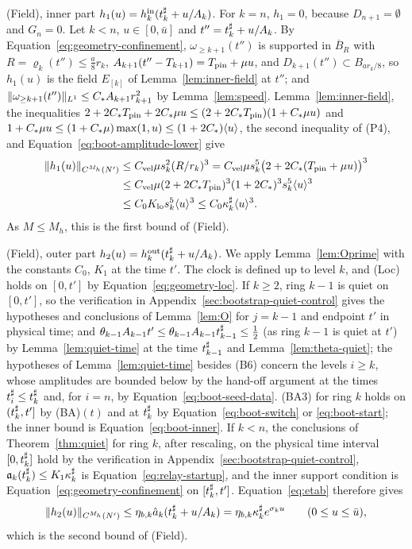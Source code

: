 (Field), inner part $h_1(u)=h^{\mathrm{in}}_k(t^\sharp_k+u/A_k)$. For $k=n$, $h_1=0$, because
$D_{n+1}=\emptyset$ and $G_n=0$. Let $k<n$, $u\in[0,\bar u]$ and
$t''=t^\sharp_k+u/A_k$. By Equation~\eqref{eq:geometry-confinement}, $\omega_{\ge k+1}(t'')$ is
supported in $\overline B_R$ with $R=\varrho_k(t'')\le\frac a8r_k$,
$A_{k+1}(t''-T_{k+1})=T_{\mathrm{pin}}+\mu u$, and $D_{k+1}(t'')\subset B_{ar_k/8}$, so
$h_1(u)$ is the field $E_{[k]}$ of Lemma~\ref{lem:inner-field} at $t''$; and
$\|\omega_{\ge k+1}(t'')\|_{L^1}\le C_{*} A_{k+1}r_{k+1}^2$ by
Lemma~\ref{lem:speed}. Lemma~\ref{lem:inner-field}, the inequalities
$2+2C_{*}T_{\mathrm{pin}}+2C_{*}\mu u\le(2+2C_{*}T_{\mathrm{pin}})(1+C_{*}\mu u)$ and
$1+C_{*}\mu u\le(1+C_{*}\mu)\max(1,u)\le(1+2C_{*})\langle u\rangle$, the second inequality of (P4), and Equation~\eqref{eq:boot-amplitude-lower} give
\begin{equation}
\label{eq:boot-inner}
\begin{aligned}
\|h_1(u)\|_{C^{M_h}(N')}&\le C_{\mathrm{vel}} \mu s_k^2(R/r_k)^3=C_{\mathrm{vel}} \mu s_k^5\big(2+2C_{*}(T_{\mathrm{pin}}+\mu u)\big)^3\\
&\le C_{\mathrm{vel}} \mu(2+2C_{*}T_{\mathrm{pin}})^3(1+2C_{*})^3s_k^5\langle u\rangle^3\\
&\le C_0K_{\mathrm{lo}} s_k^5\langle u\rangle^3\le C_0\kappa^\sharp_k\langle u\rangle^3 .
\end{aligned}
\end{equation}
As $M\le M_h$, this is the first bound of (Field).

(Field), outer part $h_2(u)=h^{\mathrm{out}}_k(t^\sharp_k+u/A_k)$. We apply
Lemma~\ref{lem:Oprime} with the constants $C_0$, $K_1$ at the time $t'$.
The clock is defined up to level $k$, and (Loc) holds on $[0,t']$ by
Equation~\eqref{eq:geometry-loc}. If $k\ge2$, ring $k-1$ is quiet on $[0,t']$,
so the verification in Appendix~\ref{sec:bootstrap-quiet-control} gives the
hypotheses and conclusions of Lemma~\ref{lem:O} for $j=k-1$ and endpoint
$t'$ in physical time; and $\theta_{k-1}A_{k-1}t'\le\theta_{k-1}A_{k-1}t^\sharp_{k-1}\le\frac12$
(as ring $k-1$ is quiet at $t'$) by Lemma~\ref{lem:quiet-time} at the time
$t^\sharp_{k-1}$ and Lemma~\ref{lem:theta-quiet}; the hypotheses of
Lemma~\ref{lem:quiet-time} besides (B6) concern the levels $i\ge k$, whose amplitudes are
bounded below by the hand-off argument at the times $t^\sharp_i\le t^\sharp_k$ and, for $i=n$, by
Equation~\eqref{eq:boot-seed-data}. (BA3) for ring $k$ holds on $(t^\sharp_k,t']$ by (BA)$(t)$ and at
$t^\sharp_k$ by Equation~\eqref{eq:boot-switch} or \eqref{eq:boot-start}; the inner
bound is Equation~\eqref{eq:boot-inner}. If $k<n$, the conclusions of
Theorem~\ref{thm:quiet} for ring $k$, after rescaling, on the physical time
interval $[0,t^\sharp_k]$ hold by the verification in
Appendix~\ref{sec:bootstrap-quiet-control},
$\mathfrak{a}_k(t^\sharp_k)\le K_1\kappa^\sharp_k$ is Equation~\eqref{eq:relay-startup}, and the
inner support condition is Equation~\eqref{eq:geometry-confinement} on
$[t^\sharp_k,t']$. Equation~\eqref{eq:etab} therefore gives
\begin{equation}
\label{eq:boot-outer}
\|h_2(u)\|_{C^{M_h}(N')}\le\eta_{b,k}\hat a_k(t^\sharp_k+u/A_k)
=\eta_{b,k}\kappa^\sharp_ke^{\sigma_ku}\qquad(0\le u\le\bar u),
\end{equation}
which is the second bound of (Field).

